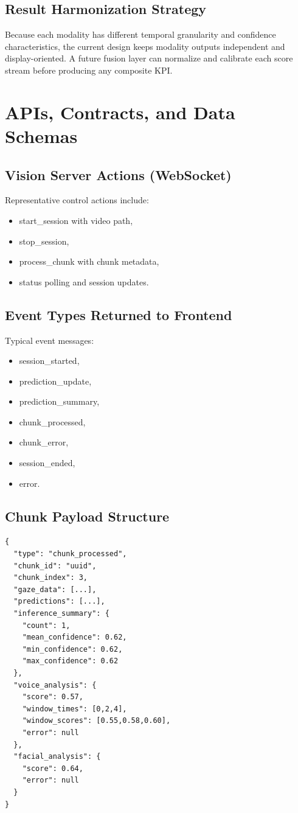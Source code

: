 \documentclass[12pt,a4paper]{report}
\begin{document}
\section{Result Harmonization Strategy}
Because each modality has different temporal granularity and confidence characteristics, the current design keeps modality outputs independent and display-oriented. A future fusion layer can normalize and calibrate each score stream before producing any composite KPI.

\chapter{APIs, Contracts, and Data Schemas}
\section{Vision Server Actions (WebSocket)}
Representative control actions include:
\begin{itemize}[leftmargin=1.5em]
\item start\_session with video path,
\item stop\_session,
\item process\_chunk with chunk metadata,
\item status polling and session updates.
\end{itemize}

\section{Event Types Returned to Frontend}
Typical event messages:
\begin{itemize}[leftmargin=1.5em]
\item session\_started,
\item prediction\_update,
\item prediction\_summary,
\item chunk\_processed,
\item chunk\_error,
\item session\_ended,
\item error.
\end{itemize}

\section{Chunk Payload Structure}
\begin{lstlisting}[style=pythonstyle,caption={Abstract chunk-processed payload shape}]
{
  "type": "chunk_processed",
  "chunk_id": "uuid",
  "chunk_index": 3,
  "gaze_data": [...],
  "predictions": [...],
  "inference_summary": {
    "count": 1,
    "mean_confidence": 0.62,
    "min_confidence": 0.62,
    "max_confidence": 0.62
  },
  "voice_analysis": {
    "score": 0.57,
    "window_times": [0,2,4],
    "window_scores": [0.55,0.58,0.60],
    "error": null
  },
  "facial_analysis": {
    "score": 0.64,
    "error": null
  }
}
\end{lstlisting}
\end{document}
